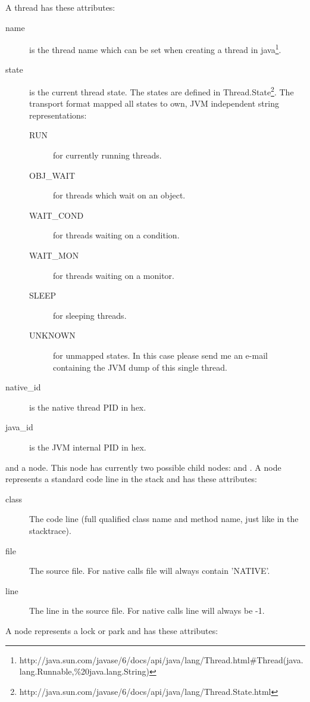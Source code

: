 A thread has these attributes:

\begin{description}
\item[name] is the thread name which can be set when creating a thread in java\footnote{http://java.sun.com/javase/6/docs/api/java/lang/Thread.html\#Thread(java.lang.Runnable,\%20java.lang.String)}.
\item[state] is the current thread state. The states are defined in Thread.State\footnote{http://java.sun.com/javase/6/docs/api/java/lang/Thread.State.html}.
The transport format mapped all states to own, JVM independent string representations:
	\begin{description}
		\item[RUN] for currently running threads.
		\item[OBJ\_WAIT] for threads which wait on an object.
		\item[WAIT\_COND] for threads waiting on a condition.
		\item[WAIT\_MON] for threads waiting on a monitor.
		\item[SLEEP] for sleeping threads.
		\item[UNKNOWN] for unmapped states. In this case please send me an e-mail containing the JVM dump of this single thread.
	\end{description}
\item[native\_id] is the native thread PID in hex.
\item[java\_id] is the JVM internal PID in hex.
\end{description}

and a  node.
This node has currently two possible child nodes:  and .
A  node represents a standard code line in the stack and has these attributes:

\begin{description}
\item[class] The code line (full qualified class name and method name, just like in the stacktrace).
\item[file] The source file. For native calls file will always contain 'NATIVE'.
\item[line] The line in the source file. For native calls line will always be -1.
\end{description}

A  node represents a lock or park and has these attributes:

